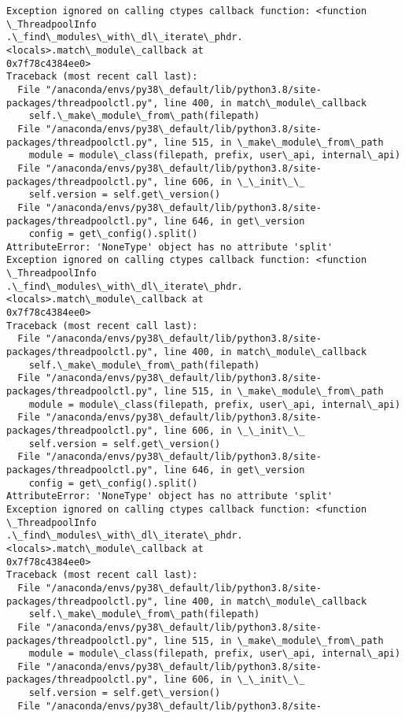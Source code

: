 \documentclass[11pt]{article}
\begin{document}
\begin{Verbatim}[commandchars=\\\{\}]
Exception ignored on calling ctypes callback function: <function \_ThreadpoolInfo
.\_find\_modules\_with\_dl\_iterate\_phdr.<locals>.match\_module\_callback at
0x7f78c4384ee0>
Traceback (most recent call last):
  File "/anaconda/envs/py38\_default/lib/python3.8/site-
packages/threadpoolctl.py", line 400, in match\_module\_callback
    self.\_make\_module\_from\_path(filepath)
  File "/anaconda/envs/py38\_default/lib/python3.8/site-
packages/threadpoolctl.py", line 515, in \_make\_module\_from\_path
    module = module\_class(filepath, prefix, user\_api, internal\_api)
  File "/anaconda/envs/py38\_default/lib/python3.8/site-
packages/threadpoolctl.py", line 606, in \_\_init\_\_
    self.version = self.get\_version()
  File "/anaconda/envs/py38\_default/lib/python3.8/site-
packages/threadpoolctl.py", line 646, in get\_version
    config = get\_config().split()
AttributeError: 'NoneType' object has no attribute 'split'
Exception ignored on calling ctypes callback function: <function \_ThreadpoolInfo
.\_find\_modules\_with\_dl\_iterate\_phdr.<locals>.match\_module\_callback at
0x7f78c4384ee0>
Traceback (most recent call last):
  File "/anaconda/envs/py38\_default/lib/python3.8/site-
packages/threadpoolctl.py", line 400, in match\_module\_callback
    self.\_make\_module\_from\_path(filepath)
  File "/anaconda/envs/py38\_default/lib/python3.8/site-
packages/threadpoolctl.py", line 515, in \_make\_module\_from\_path
    module = module\_class(filepath, prefix, user\_api, internal\_api)
  File "/anaconda/envs/py38\_default/lib/python3.8/site-
packages/threadpoolctl.py", line 606, in \_\_init\_\_
    self.version = self.get\_version()
  File "/anaconda/envs/py38\_default/lib/python3.8/site-
packages/threadpoolctl.py", line 646, in get\_version
    config = get\_config().split()
AttributeError: 'NoneType' object has no attribute 'split'
Exception ignored on calling ctypes callback function: <function \_ThreadpoolInfo
.\_find\_modules\_with\_dl\_iterate\_phdr.<locals>.match\_module\_callback at
0x7f78c4384ee0>
Traceback (most recent call last):
  File "/anaconda/envs/py38\_default/lib/python3.8/site-
packages/threadpoolctl.py", line 400, in match\_module\_callback
    self.\_make\_module\_from\_path(filepath)
  File "/anaconda/envs/py38\_default/lib/python3.8/site-
packages/threadpoolctl.py", line 515, in \_make\_module\_from\_path
    module = module\_class(filepath, prefix, user\_api, internal\_api)
  File "/anaconda/envs/py38\_default/lib/python3.8/site-
packages/threadpoolctl.py", line 606, in \_\_init\_\_
    self.version = self.get\_version()
  File "/anaconda/envs/py38\_default/lib/python3.8/site-

\end{Verbatim}
\end{document}
